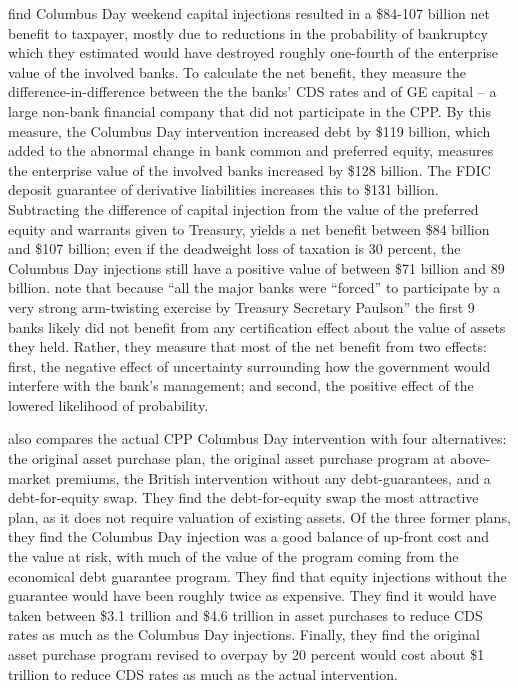 \documentclass[12pt]{article}
\begin{document}
\citet{Gift} find Columbus Day weekend capital injections resulted in a \$84-107 billion net benefit to taxpayer, mostly due to reductions in the probability of bankruptcy which they estimated would have destroyed roughly one-fourth of the enterprise value of the involved banks. To calculate the net benefit, they measure the difference-in-difference between the the banks' CDS rates and of GE capital -- a large non-bank financial company that did not participate in the CPP. By this measure, the Columbus Day intervention increased debt by \$119 billion, which added to the abnormal change in bank common and preferred equity, measures the enterprise value of the involved banks increased by \$128 billion. The FDIC deposit guarantee of derivative liabilities increases this to \$131 billion. Subtracting the difference of capital injection from the value of the preferred equity and warrants given to Treasury, yields a net benefit between \$84 billion and \$107 billion; even if the deadweight loss of taxation is 30 percent, the Columbus Day injections still have a positive value of between \$71 billion and 89 billion. \citet{Gift} note that because ``all the major banks were ``forced'' to participate by a very strong arm-twisting exercise by Treasury Secretary Paulson'' the first 9 banks likely did not benefit from any certification effect about the value of assets they held. Rather, they measure that most of the net benefit from two effects: first, the negative effect of uncertainty surrounding how the government would interfere with the bank's management; and second, the positive effect of the lowered likelihood of probability. 

\citet{Gift} also compares the actual CPP Columbus Day intervention with four alternatives: the original asset purchase plan, the original asset purchase program at above-market premiums, the British intervention without any debt-guarantees, and a debt-for-equity swap. They find the debt-for-equity swap the most attractive plan, as it does not require valuation of existing assets. Of the three former plans, they find the Columbus Day injection was a good balance of up-front cost and the value at risk, with much of the value of the program coming from the economical debt guarantee program. They find that equity injections without the guarantee would have been roughly twice as expensive. They find it would have taken between \$3.1 trillion and \$4.6 trillion in asset purchases to reduce CDS rates as much as the Columbus Day injections. Finally, they find the original asset purchase program revised to overpay by 20 percent would cost about \$1 trillion to reduce CDS rates as much as the actual intervention. 
\newpage
{}
\end{document}
